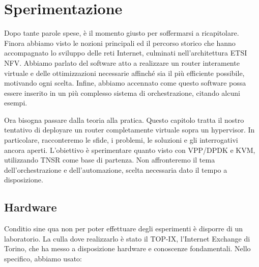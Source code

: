 \chapter{Sperimentazione}
\label{chap:lab}


Dopo tante parole spese, è il momento giusto per soffermarsi a ricapitolare. Finora abbiamo visto le nozioni principali ed il percorso storico che hanno accompagnato lo sviluppo delle reti Internet, culminati nell'architettura ETSI NFV. Abbiamo parlato del software atto a realizzare un router interamente virtuale e delle ottimizzazioni necessarie affinché sia il più efficiente possibile, motivando ogni scelta. Infine, abbiamo accennato come questo software possa essere inserito in un più complesso sistema di orchestrazione, citando alcuni esempi.

Ora bisogna passare dalla teoria alla pratica. Questo capitolo tratta il nostro tentativo di deployare un router completamente virtuale sopra un hypervisor. In particolare, racconteremo le sfide, i problemi, le soluzioni e gli interrogativi ancora aperti. L'obiettivo è sperimentare quanto visto con VPP/DPDK e KVM, utilizzando TNSR come base di partenza. Non affronteremo il tema dell'orchestrazione e dell'automazione, scelta necessaria dato il tempo a disposizione.

\section{Hardware}

Conditio sine qua non per poter effettuare degli esperimenti è disporre di un laboratorio. La culla dove realizzarlo è stato il TOP-IX, l'Internet Exchange di Torino, che ha messo a disposizione hardware e conoscenze fondamentali. Nello specifico, abbiamo usato:

